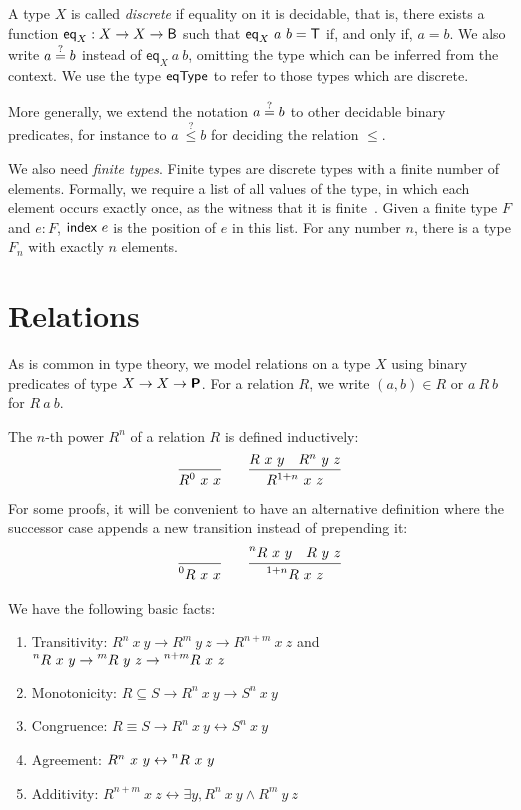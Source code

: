 A type $X$ is called \emph{discrete} if equality on it is decidable, that is, there exists a function $\textsf{eq}_X : X \rightarrow X \rightarrow \textsf{B}$ such that $\textsf{eq}_X~a~b = \mathsf{T}$ if, and only if, $a = b$. We also write $a\overset{?}{=}b$ instead of $\textsf{eq}_X~a~b$, omitting the type which can be inferred from the context. We use the type $\textsf{eqType}$ to refer to those types which are discrete.

More generally, we extend the notation $a\overset{?}{=}b$ to other decidable binary predicates, for instance to $a~\overset{?}{\le} b$ for deciding the relation $\le$.

We also need \emph{finite types}. Finite types are discrete types with a finite number of elements. Formally, we require a list of all values of the type, in which each element occurs exactly once, as the witness that it is finite~\cite{menz2016}. Given a finite type $F$ and $e : F$, $\textsf{index}~e$ is the position of $e$ in this list.
For any number $n$, there is a type $F_n$ with exactly $n$ elements.

\section{Relations}
As is common in type theory, we model relations on a type $X$ using binary predicates of type $X \rightarrow X \rightarrow \textsf{\bfseries P}$. 
For a relation $R$, we write $(a, b) \in R$ or $a~R~b$ for $R~a~b$. 

The $n$-th power $R^n$ of a relation $R$ is defined inductively:
\begin{align*}
  \infer{R^0~x~x}{}
  \qquad
  \infer{R^{\natS{n}}~x~z}{R~x~y\quad R^n~y~z}
\end{align*}
For some proofs, it will be convenient to have an alternative definition where the successor case appends a new transition instead of prepending it:
\begin{align*}
  \infer{\prescript{0}{}R~x~x}{}
  \qquad
  \infer{\prescript{\natS{n}}{}R~x~z}{\prescript{n}{}R~x~y\quad R~y~z}
\end{align*}

\begin{proposition}\label{prop:relpower}
  We have the following basic facts:
  \begin{enumerate}
    \item Transitivity: $R^n~x~y \rightarrow R^m~y~z \rightarrow R^{n+m}~x~z$ and $\prescript{n}{}R~x~y \rightarrow \prescript{m}{}R~y~z \rightarrow \prescript{n+m}{}R~x~z$
    \item Monotonicity: $R \subseteq S \rightarrow R^n~x~y \rightarrow S^n~x~y$
    \item Congruence: $R \equiv S \rightarrow R^n~x~y \leftrightarrow S^n~x~y$
    \item Agreement: $R^n~x~y \leftrightarrow \prescript{n}{}R~x~y$
    \item Additivity: $R^{n+m}~x~z \leftrightarrow \exists y, R^n~x~y \land R^m~y~z$
  \end{enumerate}
\end{proposition}

